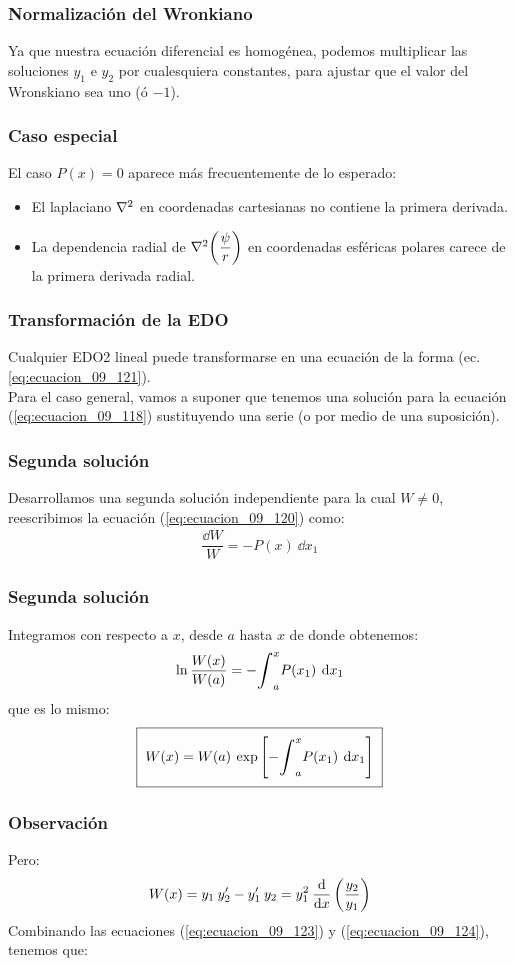 \documentclass[12pt]{beamer}
\begin{document}
\begin{frame}
\frametitle{Normalización del Wronkiano}
Ya que nuestra ecuación diferencial es homogénea, podemos multiplicar las soluciones $y_{1}$ e $y_{2}$ por cualesquiera constantes, para ajustar que el valor del Wronskiano sea uno (ó $-1$).
\end{frame}
\begin{frame}
\frametitle{Caso especial}
El caso $P(x) = 0$ aparece más frecuentemente de lo esperado:
\begin{itemize}
\item El laplaciano $\laplacian$ en coordenadas cartesianas no contiene la primera derivada.
\item La dependencia radial de $\laplacian (\dfrac{\psi}{r})$ en coordenadas esféricas polares carece de la primera derivada radial.
\end{itemize}
\end{frame}
\begin{frame}
\frametitle{Transformación de la EDO}
Cualquier EDO2 lineal puede transformarse en una ecuación de la forma (ec. \ref{eq:ecuacion_09_121}).
\\
\bigskip
\pause
Para el caso general, vamos a suponer que tenemos una solución para la ecuación (\ref{eq:ecuacion_09_118}) sustituyendo una serie (o por medio de una suposición). 
\end{frame}
\begin{frame}
\frametitle{Segunda solución}
Desarrollamos una segunda solución independiente para la cual $W \neq 0$, reescribimos la ecuación (\ref{eq:ecuacion_09_120}) como:
\pause
\begin{align*}
\dfrac{\dd{W}}{W} = - P(x) \: \dd{x_{1}}
\end{align*}
\end{frame}
\begin{frame}
\frametitle{Segunda solución}
Integramos con respecto a $x$, desde $a$ hasta $x$ de donde obtenemos:
\pause
\begin{align*}
\ln \dfrac{W(x)}{W(a)} = - \scaleint{6ex}_{a}^{x} P(x_{1}) \: \dd{x_{1}}
\end{align*}
\pause
que es lo mismo:
\pause
\begin{align}
\setlength{\fboxsep}{2\fboxsep}\boxed{W(x) = W(a) \: \exp \left[ - \scaleint{6ex}_{a}^{x} P(x_{1}) \: \dd{x_{1}} \right]}
\label{eq:ecuacion_09_123}
\end{align}
\end{frame}
\begin{frame}
\frametitle{Observación}
Pero:
\pause
\begin{align}
W(x) = y_{1} \: {y}^{\prime}_{2} - {y}^{\prime}_{1} \: y_{2} = y_{1}^{2} \: \dv{x} \left( \dfrac{y_{2}}{y_{1}} \right)
\label{eq:ecuacion_09_124}
\end{align}
Combinando las ecuaciones (\ref{eq:ecuacion_09_123}) y (\ref{eq:ecuacion_09_124}), tenemos que:
\end{frame}
\end{document}
